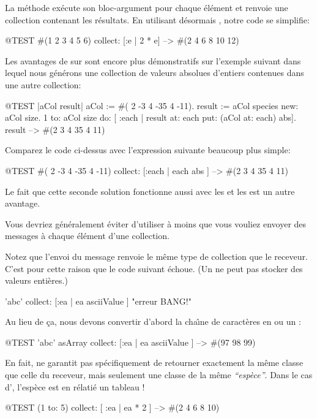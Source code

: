 \documentclass[a4paper,10pt,twoside]{book}
\begin{document}
\noindent
La m\'ethode  ex\'ecute son bloc-argument
pour chaque \'el\'ement et renvoie une collection contenant les r\'esultats.
En utilisant d\'esormais , notre code se simplifie:
\begin{code}{@TEST}
#(1 2 3 4 5 6) collect: [:e | 2 * e] --> #(2 4 6 8 10 12)
\end{code}

Les avantages de  sur  sont encore
plus d\'emonstratifs sur l'exemple suivant dans lequel nous g\'en\'erons
une collection de valeurs absolues d'entiers contenues dans une autre
collection:

\begin{code}{@TEST |aCol result|}
aCol :=  #( 2 -3 4 -35 4 -11).
result := aCol species new: aCol size.
1 to: aCol size do: [ :each | result at: each put: (aCol at: each) abs].
result --> #(2 3 4 35 4 11)
\end{code}
\noindent
Comparez le code ci-dessus avec l'expression suivante beaucoup plus simple:
\begin{code}{@TEST}
#( 2 -3 4 -35 4 -11) collect: [:each | each abs ] --> #(2 3 4 35 4 11)
\end{code}
\noindent
Le fait que cette seconde solution fonctionne aussi avec les  et les  est un autre avantage.

Vous devriez g\'en\'eralement \'eviter d'utiliser  \`a moins que 
vous vouliez envoyer des messages \`a chaque \'el\'ement d'une collection.

Notez que l'envoi du message  renvoie le m\^eme type de collection
que le receveur.
C'est pour cette raison que le code suivant \'echoue.
(Un  ne peut pas stocker des valeurs enti\`eres.)
\begin{code}{}
'abc' collect: [:ea | ea asciiValue ]      "erreur BANG!"
\end{code}
\noindent
Au lieu de \c{c}a, nous devons convertir d'abord la cha\^{\i}ne de caract\`eres
en  ou un :
\begin{code}{@TEST}
'abc' asArray collect: [:ea | ea asciiValue ] --> #(97 98 99)
\end{code}

En fait,  ne garantit pas sp\'ecifiquement de retourner 
exactement la m\^eme classe que celle du receveur, mais seulement une classe
de la m\^eme \emph{``esp\`ece''}.  Dans le cas d', l'esp\`ece est en r\'elati\'e un tableau !
\begin{code}{@TEST}
(1 to: 5) collect: [ :ea | ea * 2 ] --> #(2 4 6 8 10)
\end{code}
\end{document}
